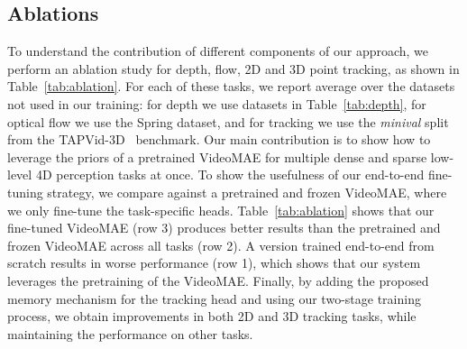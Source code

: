 \subsection{Ablations}\label{sec:ablation}
To understand the contribution of different components of our approach, we perform an ablation study for depth, flow, 2D and 3D point tracking, as shown in Table~\ref{tab:ablation}.
For each of these tasks, we report average over the datasets not used in our training: for depth we use datasets in Table~\ref{tab:depth}, for optical flow we use the Spring dataset, and for tracking we use the \textit{minival} split from the TAPVid-3D~\cite{koppula2024tapvid3d} benchmark.
Our main contribution is to show how to leverage the priors of a pretrained VideoMAE for multiple dense and sparse low-level 4D perception tasks at once.
To show the usefulness of our end-to-end fine-tuning strategy, we compare against a pretrained and frozen VideoMAE, where we only fine-tune the task-specific heads. 
Table~\ref{tab:ablation} shows that our fine-tuned VideoMAE (row 3) produces better results than the pretrained and frozen VideoMAE across all tasks (row 2). 
A version trained end-to-end from scratch results in worse performance (row 1), which shows that our system leverages the pretraining of the VideoMAE.
Finally, by adding the proposed memory mechanism for the tracking head and using our two-stage training process, we obtain improvements in both 2D and 3D tracking tasks, while maintaining the performance on other tasks.

